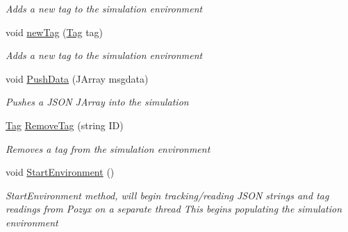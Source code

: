 \begin{DoxyCompactItemize}
\begin{DoxyCompactList}\small\item\em Adds a new tag to the simulation environment \end{DoxyCompactList}\item 
void \hyperlink{class_pozyx_positioner_1_1_framework_1_1_sim_environment_ae804be21b53900cbac13c0cce385b170}{new\+Tag} (\hyperlink{class_pozyx_positioner_1_1_framework_1_1_tag}{Tag} tag)
\begin{DoxyCompactList}\small\item\em Adds a new tag to the simulation environment \end{DoxyCompactList}\item 
void \hyperlink{class_pozyx_positioner_1_1_framework_1_1_sim_environment_a94e341475ddb03c2c27dd253748ad65a}{Push\+Data} (J\+Array msgdata)
\begin{DoxyCompactList}\small\item\em Pushes a J\+S\+ON J\+Array into the simulation \end{DoxyCompactList}\item 
\hyperlink{class_pozyx_positioner_1_1_framework_1_1_tag}{Tag} \hyperlink{class_pozyx_positioner_1_1_framework_1_1_sim_environment_aa69448aa9bc85a646b57b753f5c5e483}{Remove\+Tag} (string ID)
\begin{DoxyCompactList}\small\item\em Removes a tag from the simulation environment \end{DoxyCompactList}\item 
void \hyperlink{class_pozyx_positioner_1_1_framework_1_1_sim_environment_a0d114a29811d19d1376273cb078f6f61}{Start\+Environment} ()
\begin{DoxyCompactList}\small\item\em Start\+Environment method, will begin tracking/reading J\+S\+ON strings and tag readings from Pozyx on a separate thread This begins populating the simulation environment \end{DoxyCompactList}\end{DoxyCompactItemize}
